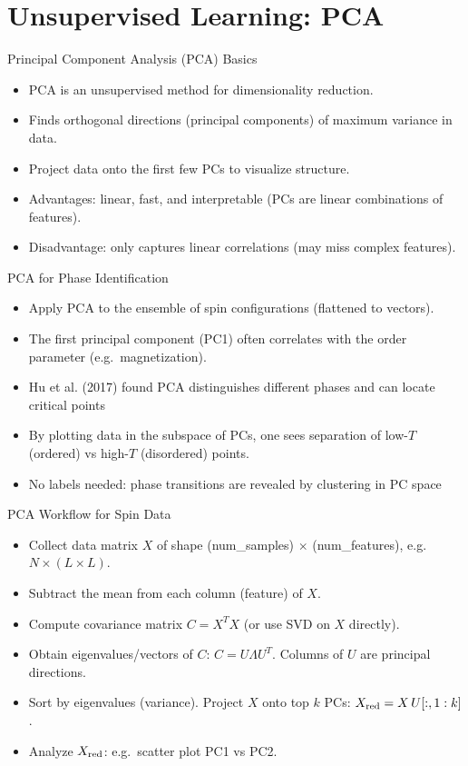 \documentclass{beamer}
\begin{document}
\section{Unsupervised Learning: PCA}

\begin{frame}{Principal Component Analysis (PCA) Basics}
 \begin{itemize}
   \item PCA is an unsupervised method for dimensionality reduction.
   \item Finds orthogonal directions (principal components) of maximum variance in data.
   \item Project data onto the first few PCs to visualize structure.
   \item Advantages: linear, fast, and interpretable (PCs are linear combinations of features).
   \item Disadvantage: only captures linear correlations (may miss complex features).
 \end{itemize}
\end{frame}

\begin{frame}{PCA for Phase Identification}
 \begin{itemize}
   \item Apply PCA to the ensemble of spin configurations (flattened to vectors).
   \item The first principal component (PC1) often correlates with the order parameter (e.g.\ magnetization).
   \item Hu et al. (2017) found PCA distinguishes different phases and can locate critical points 
   \item By plotting data in the subspace of PCs, one sees separation of low-$T$ (ordered) vs high-$T$ (disordered) points.
   \item No labels needed: phase transitions are revealed by clustering in PC space 
 \end{itemize}
\end{frame}

\begin{frame}{PCA Workflow for Spin Data}
 \begin{itemize}
   \item Collect data matrix $X$ of shape (num\_samples) $\times$ (num\_features), e.g. $N\times (L\times L)$.
   \item Subtract the mean from each column (feature) of $X$.
   \item Compute covariance matrix $C = X^T X$ (or use SVD on $X$ directly).
   \item Obtain eigenvalues/vectors of $C$: $C = U \Lambda U^T$. Columns of $U$ are principal directions.
   \item Sort by eigenvalues (variance). Project $X$ onto top $k$ PCs: $X_{\rm red} = X\,U[:,1:k]$.
   \item Analyze $X_{\rm red}$: e.g.\ scatter plot PC1 vs PC2.
 \end{itemize}
\end{frame}
\end{document}
